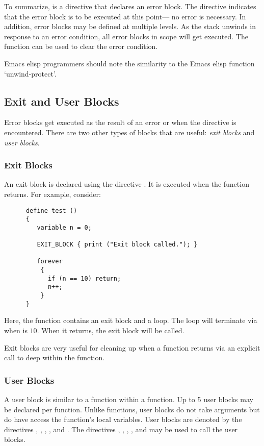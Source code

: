    To summarize,  is a directive that declares an error block.
   The  directive indicates that the error block is to
   be executed at this point--- no error is necessary.  In addition, error
   blocks may be defined at multiple levels.  As the stack unwinds in
   response to an error condition, all error blocks in scope will get
   executed.  The function  can be used to clear the error
   condition.

   Emacs elisp programmers should note the similarity to the Emacs elisp
   function `unwind-protect'.

\subsection{Exit and User Blocks}

   Error blocks get executed as the result of an error or when the directive
    is encountered.  There are two other types of
   blocks that are useful: {\em exit blocks} and {\em user blocks}.
   
\subsubsection{Exit Blocks}
   
   An exit block is declared using the directive .  It is executed
   when the function returns.  For example, consider:
\begin{verbatim}
      define test ()
      {
         variable n = 0;
         
         EXIT_BLOCK { print ("Exit block called."); }
         
         forever
          {
            if (n == 10) return;
            n++;
          }
      }
\end{verbatim}
   Here, the function contains an exit block and a  loop.  The
   loop will terminate via  when  is $10$.  When it
   returns, the exit block will be called.

   Exit blocks are very useful for cleaning up when a function returns via
   an explicit call to  deep within the function.  
   
   
\subsubsection{User Blocks}

   A user block is similar to a function within a function.  Up to 5 user
   blocks may be declared per function.  Unlike functions, user blocks do
   not take arguments but do have access the function's local variables.
   User blocks are denoted by the directives ,
   , , , and
   .  The directives ,
   , , , and
    may be used to call the user blocks.

